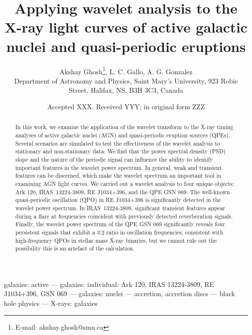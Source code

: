 \documentclass[fleqn,usenatbib]{mnras}
\title[Wavelet analysis of AGN and QPEs]{Applying wavelet analysis to the X-ray light curves of active galactic nuclei and quasi-periodic eruptions}
\author[A. Ghosh et al.]{
Akshay Ghosh\thanks{E-mail: akshay.ghosh@smu.ca},
L. C. Gallo,
A. G. Gonzalez
\\
Department of Astronomy and Physics, Saint Mary’s University, 923 Robie Street, Halifax, NS, B3H 3C3, Canada%
}
\date{Accepted XXX. Received YYY; in original form ZZZ}
\begin{document}
\label{firstpage}
\pagerange{\pageref{firstpage}--\pageref{lastpage}}
\maketitle

\begin{abstract}
In this work, we examine the application of the wavelet transform to the X-ray timing analyses of active galactic nuclei (AGN) and quasi-periodic eruption sources (QPEs).   Several scenarios are simulated to test the effectiveness of the wavelet analysis to stationary and non-stationary data.   We find that the power spectral density (PSD) slope and the nature of the periodic signal can influence the ability to identify important features in the wavelet power spectrum.   In general, weak and transient features can be discerned, which make the wavelet spectrum an important tool in examining AGN light curves.  We carried out a wavelet analysis to four unique objects: Ark 120, IRAS~13224-3809, RE J1034+396, and the QPE GSN 069.  The well-known quasi-periodic oscillation (QPO) in RE J1034+396 is significantly detected in the wavelet power spectrum.  In IRAS~13224-3809, significant transient features appear during a flare at frequencies coincident with previously detected reverberation signals.  Finally, the wavelet power spectrum of the QPE GSN 069 significantly reveals four persistent signals that exhibit a 3:2 ratio in oscillation frequencies, consistent with high-frequency QPOs in stellar mass X-ray binaries, but we cannot rule out the possibility this is an artefact of the calculation.
\end{abstract}

\begin{keywords}
galaxies: active — galaxies: individual: Ark 120, IRAS 13224-3809, RE J1034+396, GSN 069 — galaxies: nuclei — accretion, accretion discs — black hole physics — X-rays: galaxies%
\end{keywords}


\end{document}
